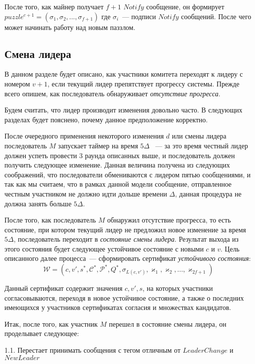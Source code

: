 После того, как майнер получает $f+1$ $Notify$ сообщение, он формирует
$puzzle^{c+1}=(\sigma_1, \sigma_2,..., \sigma_{f+1})$
где $\sigma_i$~--- подписи $Notify$ сообщений. После чего может начинать работу над новым паззлом.

\subsection{Смена лидера} \label{leader-change}
В данном разделе будет описано, как участники комитета переходят к лидеру с номером $v+1$, если текущий лидер препятствует прогрессу системы. Прежде всего опишем, как последователь обнаруживает \textit{отсутствие прогресса}.

Будем считать, что лидер производит изменения довольно часто. В следующих разделах будет пояснено, почему данное предположение корректно.

После очередного применения некоторого изменения $d$ или смены лидера последователь $M$ запускает таймер на время $5\Delta$ ~--- за это время честный лидер должен успеть провести 3 раунда описанных выше, и последователь должен получить следующее изменение.
Данная величина получена из следующих соображений, что последователи обмениваются с лидером пятью сообщениями, и так как мы считаем, что в рамках данной модели сообщение, отправленное честным участником не должно идти дольше времени $\Delta$, данная процедура не должна занять больше $5\Delta$.

После того, как последователь $M$ обнаружил отсутствие прогресса, то есть состояние, при котором текущий лидер не предложил новое изменение за время $5\Delta$, последователь переходит в \textit{состояние смены лидера}.
Результат выхода из этого состояния будет следующее устойчивое состояние с новыми $c$ и $v$.
Цель описанного далее процесса~--- сформировать сертификат \textit{устойчивого состояния}:
$$\mathcal{W}=(c, v', s^{*}, \mathcal{C}^{*}, \mathcal{P}^{*}, Q^{*}, \sigma_{L(c, v')}, \varkappa_1, \varkappa_2,..., \varkappa_{2f+1})$$

Данный сертификат содержит значения $c, v', s$, на которых участники согласовываются, переходя в новое устойчивое состояние, а также о последних имеющихся у участников сертификатах согласия и множествах кандидатов.

Итак, после того, как участник $M$ перешел в состояние смены лидера, он проделывает следующее:

1.1. Перестает принимать сообщения с тегом отличным от $LeaderChange$ и $NewLeader$

